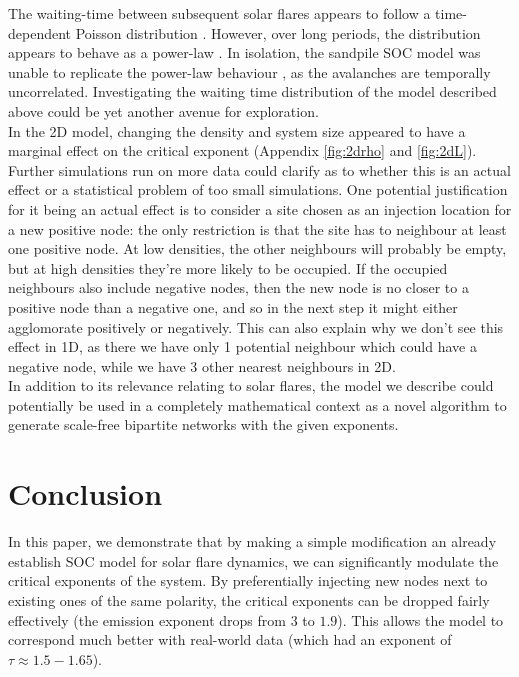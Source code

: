 \documentclass[aps, pre, reprint]{revtex4-2}
\begin{document}
The waiting-time between subsequent solar flares appears to follow a time-dependent Poisson distribution \cite{WheatlandWTD}. However, over long periods, the distribution appears to behave as a power-law \cite{BoffettaSolarFlares}. In isolation, the sandpile SOC model was unable to replicate the power-law behaviour \cite{MayaBTWWaitingTimes}, as the avalanches are temporally uncorrelated. Investigating the waiting time distribution of the model described above could be yet another avenue for exploration. \\

In the 2D model, changing the density and system size appeared to have a marginal effect on the critical exponent (Appendix \autoref{fig:2drho} and \autoref{fig:2dL}). Further simulations run on more data could clarify as to whether this is an actual effect or a statistical problem of too small simulations. One potential justification for it being an actual effect is to consider a site chosen as an injection location for a new positive node: the only restriction is that the site has to neighbour at least one positive node. At low densities, the other neighbours will probably be empty, but at high densities they're more likely to be occupied. If the occupied neighbours also include negative nodes, then the new node is no closer to a positive node than a negative one, and so in the next step it might either agglomorate positively or negatively. This can also explain why we don't see this effect in 1D, as there we have only 1 potential neighbour which could have a negative node, while we have 3 other nearest neighbours in 2D. \\

In addition to its relevance relating to solar flares, the model we describe could potentially be used in a completely mathematical context as a novel algorithm to generate scale-free bipartite networks with the given exponents.


\section{Conclusion}

In this paper, we demonstrate that by making a simple modification an already establish SOC model for solar flare dynamics, we can significantly modulate the critical exponents of the system. By preferentially injecting new nodes next to existing ones of the same polarity, the critical exponents can be dropped fairly effectively (the emission exponent drops from $3$ to $1.9$). This allows the model to correspond much better with real-world data (which had an exponent of $\tau\approx1.5-1.65$). \\
\end{document}
